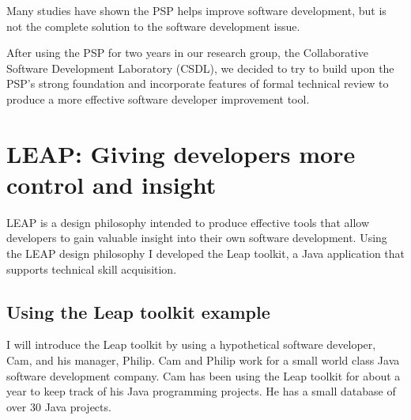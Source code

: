 Many studies have shown the PSP helps improve software
development\cite{Ferguson97,Hayes97,Khajenoori95,Ramsey96}, but is not the
complete solution to the software development issue. 

After using the PSP for two years in our research group, the Collaborative
Software Development Laboratory (CSDL), we decided to try to build upon the PSP's
strong foundation and incorporate features of formal technical review to
produce a more effective software developer improvement tool.

\section{LEAP: Giving developers more control and insight}

LEAP is a design philosophy intended to produce effective tools that allow
developers to gain valuable insight into their own software development.  Using 
the LEAP design philosophy I developed the Leap toolkit, a Java application
that supports technical skill acquisition.

\subsection*{Using the Leap toolkit example}
I will introduce the Leap toolkit by using a hypothetical software developer,
Cam, and his manager, Philip. Cam and Philip work for a small world class Java
software development company.  Cam has been using the Leap toolkit for about a
year to keep track of his Java programming projects.  He has a small database
of over 30 Java projects.  

